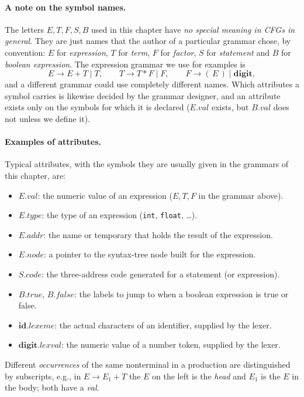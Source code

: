 \documentclass[11pt,a4paper]{article}
\newcommand{\at}[2]{\ensuremath{#1.\mathit{#2}}}
\begin{document}
\paragraph{A note on the symbol names.} The letters $E, T, F, S, B$ used in this chapter have \emph{no special meaning in CFGs in general}. They are just names that the author of a particular grammar chose, by convention: $E$ for \emph{expression}, $T$ for \emph{term}, $F$ for \emph{factor}, $S$ for \emph{statement} and $B$ for \emph{boolean expression}. The expression grammar we use for examples is
\[
E \to E + T \mid T, \qquad T \to T * F \mid F, \qquad F \to (\,E\,) \mid \mathbf{digit},
\]
and a different grammar could use completely different names. Which attributes a symbol carries is likewise decided by the grammar designer, and an attribute exists only on the symbols for which it is declared (\at{E}{val} exists, but \at{B}{val} does not unless we define it).

\paragraph{Examples of attributes.} Typical attributes, with the symbols they are usually given in the grammars of this chapter, are:
\begin{itemize}[nosep]
\item \at{E}{val}: the numeric value of an expression ($E,T,F$ in the grammar above).
\item \at{E}{type}: the type of an expression (\texttt{int}, \texttt{float}, \dots).
\item \at{E}{addr}: the name or temporary that holds the result of the expression.
\item \at{E}{node}: a pointer to the syntax-tree node built for the expression.
\item \at{S}{code}: the three-address code generated for a statement (or expression).
\item \at{B}{true}, \at{B}{false}: the labels to jump to when a boolean expression is true or false.
\item \at{\mathbf{id}}{lexeme}: the actual characters of an identifier, supplied by the lexer.
\item \at{\mathbf{digit}}{lexval}: the numeric value of a number token, supplied by the lexer.
\end{itemize}

Different \emph{occurrences} of the same nonterminal in a production are distinguished by subscripts, e.g., in $E \to E_1 + T$ the $E$ on the left is the \emph{head} and $E_1$ is the $E$ in the body; both have a \textit{val}.
\end{document}
